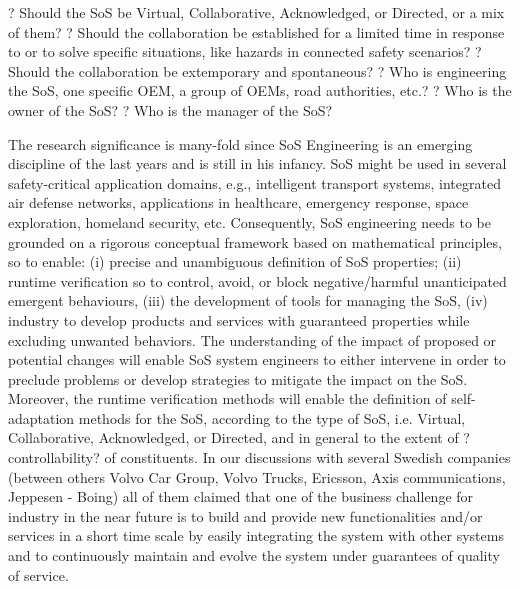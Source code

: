 ?	Should the SoS be Virtual, Collaborative, Acknowledged, or Directed, or a mix of them?
?	Should the collaboration be established for a limited time in response to or to solve specific situations, like hazards in connected safety scenarios?
?	Should the collaboration be extemporary and spontaneous?
?	Who is engineering the SoS, one specific OEM, a group of OEMs, road authorities, etc.?
?	Who is the owner of the SoS?
?	Who is the manager of the SoS?


The
research significance is many-fold since SoS Engineering is an emerging discipline of the last years and is still in
his infancy. SoS might be used in several safety-critical application domains, e.g., intelligent transport systems,
integrated air defense networks, applications in healthcare, emergency response, space exploration, homeland
security, etc. Consequently, SoS engineering needs to be grounded on a rigorous conceptual framework based
on mathematical principles, so to enable: (i) precise and unambiguous definition of SoS properties; (ii) runtime
verification so to control, avoid, or block negative/harmful unanticipated emergent behaviours, (iii) the development
of tools for managing the SoS, (iv) industry to develop products and services with guaranteed properties
while excluding unwanted behaviors. The understanding of the impact of proposed or potential changes will
enable SoS system engineers to either intervene in order to preclude problems or develop strategies to mitigate
the impact on the SoS. Moreover, the runtime verification methods will enable the definition of self-adaptation
methods for the SoS, according to the type of SoS, i.e. Virtual, Collaborative, Acknowledged, or Directed, and
in general to the extent of ?controllability? of constituents.
In our discussions with several Swedish companies (between others Volvo Car Group, Volvo Trucks, Ericsson,
Axis communications, Jeppesen - Boing) all of them claimed that one of the business challenge for industry
in the near future is to build and provide new functionalities and/or services in a short time scale by easily integrating
the system with other systems and to continuously maintain and evolve the system under guarantees of
quality of service.



